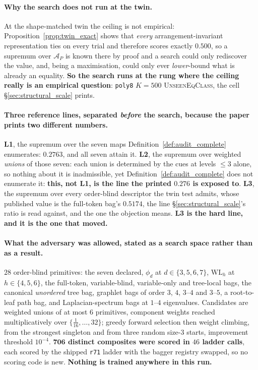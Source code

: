 \paragraph{Why the search does not run at the twin.} At the shape-matched twin the ceiling is not empirical: Proposition~\ref{prop:twin_exact} shows that \emph{every} arrangement-invariant representation ties on every trial and therefore scores exactly $0.500$, so a supremum over $\mathcal{A}_P$ is known there by proof and a search could only rediscover the value, and, being a maximisation, could only ever \emph{lower}-bound what is already an equality. \textbf{So the search runs at the rung where the ceiling really is an empirical question}: \texttt{poly8} $K{=}500$ \textsc{UnseenEqClass}, the cell \S\ref{sec:structural_scale} prints.

\paragraph{Three reference lines, separated \emph{before} the search, because the paper prints two different numbers.} \textbf{L1}, the supremum over the seven maps Definition~\ref{def:audit_complete} enumerates: $\mathbf{0.2763}$, and all seven attain it. \textbf{L2}, the supremum over weighted \emph{unions} of those seven: each union is determined by the cues at levels ${\leq}3$ alone, so nothing about it is inadmissible, yet Definition~\ref{def:audit_complete} does not enumerate it: \textbf{this, not L1, is the line the printed $0.276$ is exposed to}. \textbf{L3}, the supremum over every order-blind descriptor the twin test admits, whose published value is the full-token bag's $\mathbf{0.5174}$, the line \S\ref{sec:structural_scale}'s ratio is read against, and the one the objection means. \textbf{L3 is the hard line, and it is the one that moved.}

\paragraph{What the adversary was allowed, stated as a search space rather than as a result.} $28$ order-blind primitives: the seven declared, $\phi_d$ at $d\in\{3,5,6,7\}$, $\mathrm{WL}_h$ at $h\in\{4,5,6\}$, the full-token, variable-blind, variable-only and tree-local bags, the canonical \emph{unordered} tree bag, graphlet bags of order $3$, $4$, $3$--$4$ and $3$--$5$, a root-to-leaf path bag, and Laplacian-spectrum bags at $1$--$4$ eigenvalues. Candidates are weighted unions of at most $6$ primitives, component weights reached multiplicatively over $\{\tfrac{1}{16},\ldots,32\}$; greedy forward selection then weight climbing, from the strongest singleton and from three random size-$3$ starts, improvement threshold $10^{-4}$. \textbf{$\mathbf{706}$ distinct composites were scored in $46$ ladder calls}, each scored by the shipped \texttt{r71} ladder with the bagger registry swapped, so no scoring code is new. \textbf{Nothing is trained anywhere in this run.}

